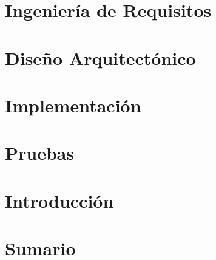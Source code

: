 \documentclass[a4paper,12pt]{article}
\begin{document}
	 \afterpage{\null\newpage}
	 \newpage
	
	\section{Ingeniería de Requisitos}
	
	\afterpage{\null\newpage}
	\newpage
	
	\section{Diseño Arquitectónico}
	
	\afterpage{\null\newpage}
	\newpage
	
	\section{Implementación}
	
	\afterpage{\null\newpage}
	\newpage
	
	
	\section{Pruebas}
	
	\afterpage{\null\newpage}
	\newpage
	
	
	\section{Introducción}
	
	\afterpage{\null\newpage}
	\newpage
	
	
	\section{Sumario}
\end{document}
